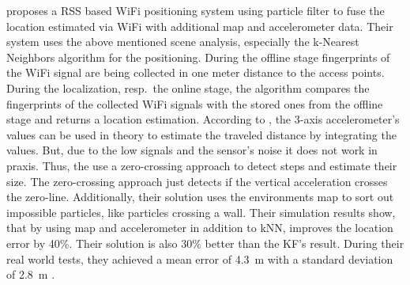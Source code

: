 \citet{wang:wlan} proposes a \acs{RSS} based WiFi positioning system using particle filter to fuse the location estimated via WiFi with additional map and accelerometer data. Their system uses the above mentioned scene analysis, especially the k-Nearest Neighbors algorithm for the positioning. During the offline stage fingerprints of the WiFi signal are being collected in one meter distance to the access points. During the localization, resp.\ the online stage, the algorithm compares the fingerprints of the collected WiFi signals with the stored ones from the offline stage and returns a location estimation. According to \citet{wang:wlan}, the 3-axis accelerometer's values can be used in theory to estimate the traveled distance by integrating the values. But, due to the low signals and the sensor's noise it does not work in praxis. Thus, the use a zero-crossing approach to detect steps and estimate their size. The zero-crossing approach just detects if the vertical acceleration crosses the zero-line. Additionally, their solution uses the environments map to sort out impossible particles, like particles crossing a wall.
Their simulation results show, that by using map and accelerometer in addition to kNN, improves the location error by 40\%. Their solution is also 30\% better than the \ac{KF}'s result. During their real world tests, they achieved a mean error of 4.3~m with a standard deviation of 2.8~m \citep{wang:wlan}.

